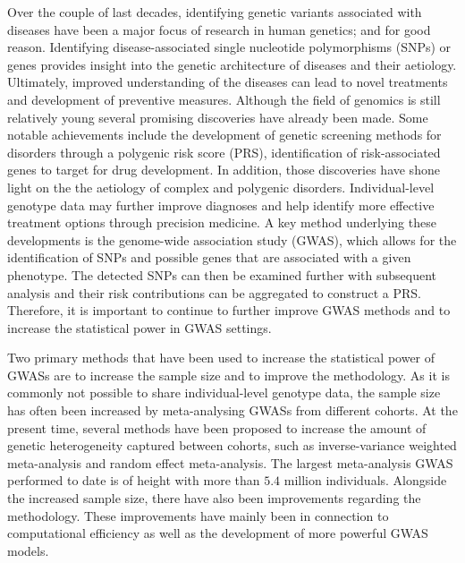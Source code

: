 
Over the couple of last decades, identifying genetic variants associated with diseases have been a major focus of research in human genetics; and for good reason. Identifying disease-associated single nucleotide polymorphisms (SNPs) or genes provides insight into the genetic architecture of diseases and their aetiology. Ultimately, improved understanding of the diseases can lead to novel treatments and development of preventive measures\cite{farkona2016cancer,goetz2018personalized}. Although the field of genomics is still relatively young several promising discoveries have already been made. Some notable achievements include the development of genetic screening methods for disorders through a polygenic risk score (PRS), identification of risk-associated genes to target for drug development\cite{goetz2018personalized}. In addition, those discoveries have shone light on the the aetiology of complex and polygenic disorders. Individual-level genotype data may further improve diagnoses and help identify more effective treatment options through precision medicine. A key method underlying these developments is the genome-wide association study (GWAS), which allows for the identification of SNPs and possible genes that are associated with a given phenotype. The detected SNPs can then be examined further with subsequent analysis and their risk contributions can be aggregated to construct a PRS\cite{prive2020ldpred2,lloyd2019improved,mak2017polygenic,yang2020accurate}. Therefore, it is important to continue to further improve GWAS methods and to increase the statistical power in GWAS settings.

Two primary methods that have been used to increase the statistical power of GWASs are to increase the sample size and to improve the methodology. As it is commonly not possible to share individual-level genotype data, the sample size has often been increased by meta-analysing GWASs from different cohorts. At the present time, several methods have been proposed to increase the amount of genetic heterogeneity captured between cohorts, such as inverse-variance weighted meta-analysis and random effect meta-analysis\cite{han2011random,willer2010metal}. The largest meta-analysis GWAS performed to date is of height with more than $ 5.4 $ million individuals\cite{yengo2022saturated}. Alongside the increased sample size, there have also been improvements regarding the methodology. These improvements have mainly been in connection to computational efficiency as well as the development of more powerful GWAS models. 

